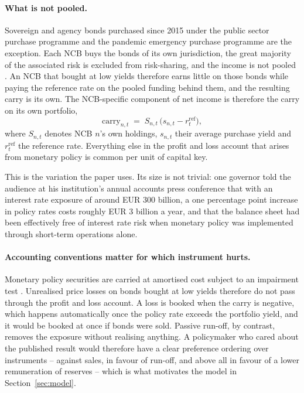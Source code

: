 \documentclass[11pt]{article}
\theoremstyle{plain}
\begin{document}
\paragraph{What is not pooled.}
Sovereign and agency bonds purchased since 2015 under the public sector purchase programme and the pandemic emergency purchase programme are the exception. Each NCB buys the bonds of its own jurisdiction, the great majority of the associated risk is excluded from risk-sharing, and the income is not pooled \citep{arrata2026}. An NCB that bought at low yields therefore earns little on those bonds while paying the reference rate on the pooled funding behind them, and the resulting carry is its own. The NCB-specific component of net income is therefore the carry on its own portfolio,
\begin{equation}\label{eq:carry}
\text{carry}_{n,t} \;=\; S_{n,t}\,\bigl(s_{n,t} - r^{\text{ref}}_t\bigr),
\end{equation}
where $S_{n,t}$ denotes NCB $n$'s own holdings, $s_{n,t}$ their average purchase yield and $r^{\text{ref}}_t$ the reference rate. Everything else in the profit and loss account that arises from monetary policy is common per unit of capital key.

This is the variation the paper uses. Its size is not trivial: one governor told the audience at his institution's annual accounts press conference that with an interest rate exposure of around EUR 300 billion, a one percentage point increase in policy rates costs roughly EUR 3 billion a year, and that the balance sheet had been effectively free of interest rate risk when monetary policy was implemented through short-term operations alone.

\paragraph{Accounting conventions matter for which instrument hurts.}
Monetary policy securities are carried at amortised cost subject to an impairment test \citep{gebauer2024}. Unrealised price losses on bonds bought at low yields therefore do not pass through the profit and loss account. A loss is booked when the carry is negative, which happens automatically once the policy rate exceeds the portfolio yield, and it would be booked at once if bonds were sold. Passive run-off, by contrast, removes the exposure without realising anything. A policymaker who cared about the published result would therefore have a clear preference ordering over instruments -- against sales, in favour of run-off, and above all in favour of a lower remuneration of reserves -- which is what motivates the model in Section~\ref{sec:model}.
\end{document}
